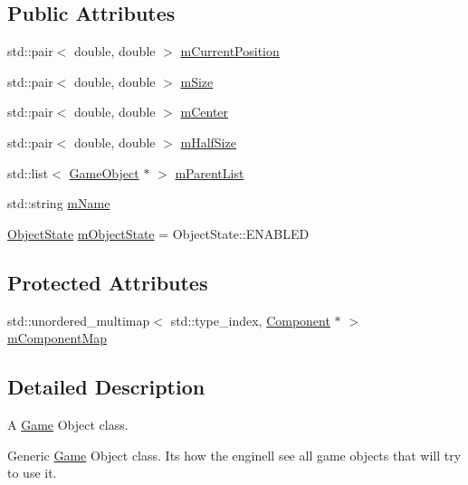 \subsection*{Public Attributes}
\begin{DoxyCompactItemize}
\item 
std\+::pair$<$ double, double $>$ \hyperlink{classengine_1_1_game_object_a0a4c0a35e88df30bef6e09df9b51e6bd}{m\+Current\+Position}
\item 
std\+::pair$<$ double, double $>$ \hyperlink{classengine_1_1_game_object_a52f18d63910240efdcd7490d81f37dc8}{m\+Size}
\item 
std\+::pair$<$ double, double $>$ \hyperlink{classengine_1_1_game_object_ae1867b69e8bfbf7d9b01a463f2e89e9a}{m\+Center}
\item 
std\+::pair$<$ double, double $>$ \hyperlink{classengine_1_1_game_object_a3d62630e8dc477795f8cc3923747aaba}{m\+Half\+Size}
\item 
std\+::list$<$ \hyperlink{classengine_1_1_game_object}{Game\+Object} $\ast$ $>$ \hyperlink{classengine_1_1_game_object_a407bc88cc30f6432b378da41ba142fae}{m\+Parent\+List}
\item 
std\+::string \hyperlink{classengine_1_1_game_object_af6c682b4912f897b9d798eb5479159bc}{m\+Name}
\item 
\hyperlink{namespaceengine_aae2fae4fa5de0d9b0accc1b59b6c2ff5}{Object\+State} \hyperlink{classengine_1_1_game_object_a14fc4192c3e64ff6c6421add7aeacad8}{m\+Object\+State} = Object\+State\+::\+E\+N\+A\+B\+L\+ED
\end{DoxyCompactItemize}
\subsection*{Protected Attributes}
\begin{DoxyCompactItemize}
\item 
std\+::unordered\+\_\+multimap$<$ std\+::type\+\_\+index, \hyperlink{classengine_1_1_component}{Component} $\ast$ $>$ \hyperlink{classengine_1_1_game_object_a6a2bc7c46e6b3ebce8b8d5a4c152db71}{m\+Component\+Map}
\end{DoxyCompactItemize}


\subsection{Detailed Description}
A \hyperlink{classengine_1_1_game}{Game} Object class. 

Generic \hyperlink{classengine_1_1_game}{Game} Object class. It\textquotesingle{}s how the engine\textquotesingle{}ll see all game objects that will try to use it. 

